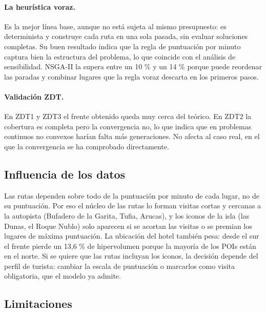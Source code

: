 \paragraph{La heurística voraz.} Es la mejor línea base, aunque no está sujeta al mismo presupuesto: es determinista y construye cada ruta en una sola pasada, sin evaluar soluciones completas. Su buen resultado indica que la regla de puntuación por minuto captura bien la estructura del problema, lo que coincide con el análisis de sensibilidad. NSGA-II la supera entre un 10 \% y un 14 \% porque puede reordenar las paradas y combinar lugares que la regla voraz descarta en los primeros pasos.

\paragraph{Validación ZDT.} En ZDT1 y ZDT3 el frente obtenido queda muy cerca del teórico. En ZDT2 la cobertura es completa pero la convergencia no, lo que indica que en problemas continuos no convexos harían falta más generaciones. No afecta al caso real, en el que la convergencia se ha comprobado directamente.

\subsection{Influencia de los datos}

Las rutas dependen sobre todo de la puntuación por minuto de cada lugar, no de su puntuación. Por eso el núcleo de las rutas lo forman visitas cortas y cercanas a la autopista (Bufadero de la Garita, Tufia, Arucas), y los iconos de la isla (las Dunas, el Roque Nublo) solo aparecen si se acortan las visitas o se premian los lugares de máxima puntuación. La ubicación del hotel también pesa: desde el sur el frente pierde un 13,6 \% de hipervolumen porque la mayoría de los POIs están en el norte. Si se quiere que las rutas incluyan los iconos, la decisión depende del perfil de turista: cambiar la escala de puntuación o marcarlos como visita obligatoria, que el modelo ya admite.

\subsection{Limitaciones}
\label{sec:limitaciones}

